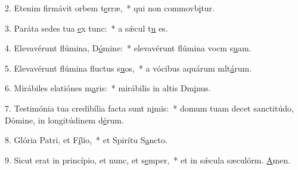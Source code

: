 2. Etenim firmávit orbem t\uline{e}rræ,~* qui non commovb\uline{i}tur.\par 
3. Paráta sedes tua \uline{e}x tunc:~* a sǽcul t\uline{u} es.\par 
4. Elevavérunt flúmina, D\uline{ó}mine:~* elevavérunt flúmina vocm s\uline{u}am.\par 
5. Elevavérunt flúmina fluctus s\uline{u}os,~* a vócibus aquárum mlt\uline{á}rum.\par 
6. Mirábiles elatiónes m\uline{a}ris:~* mirábilis in altis Dm\uline{i}nus.\par 
7. Testimónia tua credibília facta sunt n\uline{i}mis:~* domum tuam decet sanctitúdo, Dómine, in longitúdinem d\uline{é}rum.\par 
8. Glória Patri, et F\uline{í}lio,~* et Spirítu S\uline{a}ncto.\par 
9. Sicut erat in princípio, et nunc, et s\uline{e}mper,~* et in sǽcula sæculórm. \uline{A}men.\par 
